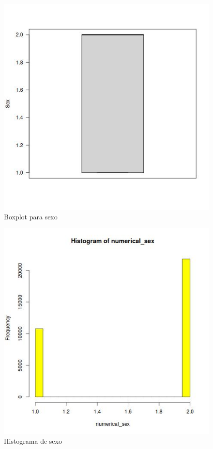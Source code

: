 \documentclass[10pt,twocolumn,a4paper]{article}
\begin{document}
\begin{figure}
    \includegraphics[width=\linewidth]{images/boxplot_sex.jpeg}
    \caption{Boxplot para sexo}
    \label{fig:boxplot_sex}
\end{figure}

\begin{figure}
    \includegraphics[width=\linewidth]{images/hist_sex.jpeg}
    \caption{Histograma de sexo}
    \label{fig:hist_sex}
\end{figure}
\end{document}
